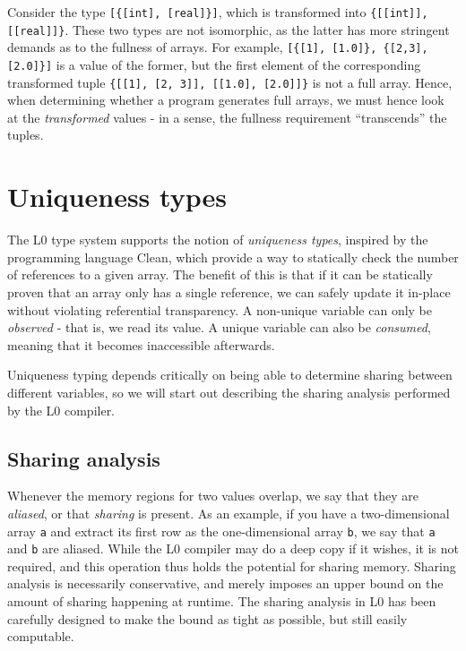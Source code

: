 \documentclass[oneside]{memoir}
\begin{document}
Consider the type \texttt{[\{[int], [real]\}]}, which is transformed
into \texttt{\{[[int]], [[real]]\}}.  These two types are not
isomorphic, as the latter has more stringent demands as to the
fullness of arrays.  For example, \texttt{[\{[1], [1.0]\}, \{[2,3],
    [2.0]\}]} is a value of the former, but the first element of
the corresponding transformed tuple 
\texttt{\{[[1], [2, 3]], [[1.0], [2.0]]\}} is not a
full array.  Hence, when determining whether a program generates full
arrays, we must hence look at the \textit{transformed} values - in a
sense, the fullness requirement ``transcends'' the tuples.

\section{Uniqueness types}
\label{sec:l0-uniqueness-types}

The L0 type system supports the notion of \emph{uniqueness types},
inspired by the programming language Clean, which provide a way to
statically check the number of references to a given array.  The
benefit of this is that if it can be statically proven that an array
only has a single reference, we can safely update it in-place without
violating referential transparency.  A non-unique variable can only be
\textit{observed} - that is, we read its value.  A unique variable can
also be \textit{consumed}, meaning that it becomes inaccessible
afterwards.

Uniqueness typing depends critically on being able to determine
sharing between different variables, so we will start out describing
the sharing analysis performed by the L0 compiler.

\subsection{Sharing analysis}
\label{subsec:l0-sharing}

Whenever the memory regions for two values overlap, we say that they
are \textit{aliased}, or that \textit{sharing} is present.  As an
example, if you have a two-dimensional array \texttt{a} and extract
its first row as the one-dimensional array \texttt{b}, we say that
\texttt{a} and \texttt{b} are aliased.  While the L0 compiler may do a
deep copy if it wishes, it is not required, and this operation thus
holds the potential for sharing memory.  Sharing analysis is
necessarily conservative, and merely imposes an upper bound on the
amount of sharing happening at runtime.  The sharing analysis in L0
has been carefully designed to make the bound as tight as possible,
but still easily computable.
\end{document}
